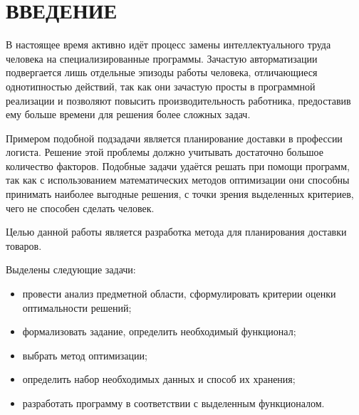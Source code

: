 \section*{ВВЕДЕНИЕ}

В настоящее время активно идёт процесс замены интеллектуального труда человека на специализированные программы. Зачастую авторматизации подвергается лишь отдельные эпизоды работы человека, отличающиеся однотипностью действий, так как они зачастую просты в программной реализации и позволяют повысить производительность работника, предоставив ему больше времени для решения более сложных задач.

Примером подобной подзадачи является планирование доставки в профессии логиста. Решение этой проблемы должно учитывать достаточно большое количество факторов. Подобные задачи удаётся решать при помощи программ, так как с использованием математических методов оптимизации они способны принимать наиболее выгодные решения, с точки зрения выделенных критериев, чего не способен сделать человек.

Целью данной работы является разработка метода для планирования доставки товаров.

Выделены следующие задачи:
\begin{itemize}
	\item провести анализ предметной области, сформулировать критерии оценки оптимальности решений;
	\item формализовать задание, определить необходимый функционал;
	\item выбрать метод оптимизации;
	\item определить набор необходимых данных и способ их хранения;
	\item разработать программу в соответствии с выделенным функционалом. 
	
\end{itemize}

\pagebreak